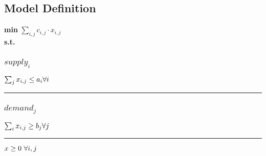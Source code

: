 \documentclass[11pt]{article}
\begin{document}
\subsection*{Model Definition}
\textbf{min} $\sum_{i,j} c_{i,j} \cdot x_{i,j}$\\
\textbf{s.t.}
\subsubsection*{$supply_{i}$}
$
\sum_{j} x_{i,j} \leq a_{i}\hfill \forall i
$
\vspace{5pt}
\hrule
\subsubsection*{$demand_{j}$}
$
\sum_{i} x_{i,j} \geq b_{j}\hfill \forall j
$
\vspace{5pt}
\hrule
\bigskip
$x\geq 0 ~ \forall i,j\\$
\end{document}
